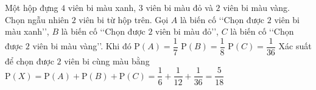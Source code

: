 \begin{ex}%
 Một hộp đựng $4$ viên bi màu xanh, $3$ viên bi màu đỏ và $2$ viên bi màu vàng. Chọn ngẫu  nhiên $2$ viên bi từ hộp trên. Gọi $A$ là biến cố \lq\lq Chọn được $2$ viên bi màu xanh\rq\rq, $B$ là biến cố \lq\lq Chọn được $2$ viên bi màu đỏ\rq\rq, $C$ là biến cố \lq\lq Chọn được $2$ viên bi màu vàng\rq\rq. Khi đó
 \choiceTF 
   {$\mathrm{P}(A)=\dfrac{1}{7}$}
  {$\mathrm{P}(B)=\dfrac{1}{8}$} 
  {\True $\mathrm{P}(C)=\dfrac{1}{36}$} 
  {\True Xác suất để  chọn được $2$ viên bi cùng màu bằng $\mathrm{P}(X)=\mathrm{P}(A)+\mathrm{P}(B)+\mathrm{P}(C)=\dfrac{1}{6}+\dfrac{1}{12}+\dfrac{1}{36}=\dfrac{5}{18}$}
\end{ex}

